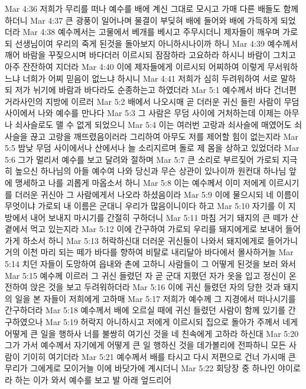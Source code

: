 Mar 4:36  저희가 무리를 떠나 예수를 배에 계신 그대로 모시고 가매 다른 배들도 함께 하더니
Mar 4:37  큰 광풍이 일어나며 물결이 부딪혀 배에 들어와 배에 가득하게 되었더라
Mar 4:38  예수께서는 고물에서 베개를 베시고 주무시더니 제자들이 깨우며 가로되 선생님이여 우리의 죽게 된것을 돌아보지 아니하시나이까 하니
Mar 4:39  예수께서 깨어 바람을 꾸짖으시며 바다더러 이르시되 잠잠하라 고요하라 하시니 바람이 그치고 아주 잔잔하여 지더라
Mar 4:40  이에 제자들에게 이르시되 어찌하여 이렇게 무서워하느냐 너희가 어찌 믿음이 없느냐 하시니
Mar 4:41  저희가 심히 두려워하여 서로 말하되 저가 뉘기에 바람과 바다라도 순종하는고 하였더라
Mar 5:1  예수께서 바다 건너편 거라사인의 지방에 이르러
Mar 5:2  배에서 나오시매 곧 더러운 귀신 들린 사람이 무덤 사이에서 나와 예수를 만나다
Mar 5:3  그 사람은 무덤 사이에 거처하는데 이제는 아무나 쇠사슬로도 맬 수 없게 되었으니
Mar 5:4  이는 여러번 고랑과 쇠사슬에 매였어도 쇠사슬을 끊고 고랑을 깨뜨렸음이러라 그리하여 아무도 저를 제어할 힘이 없는지라
Mar 5:5  밤낮 무덤 사이에서나 산에서나 늘 소리지르며 돌로 제 몸을 상하고 있었더라
Mar 5:6  그가 멀리서 예수를 보고 달려와 절하며
Mar 5:7  큰 소리로 부르짖어 가로되 지극히 높으신 하나님의 아들 예수여 나와 당신과 무슨 상관이 있나이까 원컨대 하나님 앞에 맹세하고 나를 괴롭게 마옵소서 하니
Mar 5:8  이는 예수께서 이미 저에게 이르시기를 더러운 귀신아 그 사람에게서 나오라 하셨음이라
Mar 5:9  이에 물으시되 네 이름이 무엇이냐 가로되 내 이름은 군대니 우리가 많음이니이다 하고
Mar 5:10  자기를 이 지방에서 내어 보내지 마시기를 간절히 구하더니
Mar 5:11  마침 거기 돼지의 큰 떼가 산 곁에서 먹고 있는지라
Mar 5:12  이에 간구하여 가로되 우리를 돼지에게로 보내어 들어가게 하소서 하니
Mar 5:13  허락하신대 더러운 귀신들이 나와서 돼지에게로 들어가니 거의 이천 마리 되는 떼가 바다를 향하여 비탈로 내리달아 바다에서 몰사하거늘
Mar 5:14  치던 자들이 도망하여 읍내와 촌에 고하니 사람들이 그 어떻게 된것을 보러 와서
Mar 5:15  예수께 이르러 그 귀신 들렸던 자 곧 군대 지폈던 자가 옷을 입고 정신이 온전하여 앉은 것을 보고 두려워하더라
Mar 5:16  이에 귀신 들렸던 자의 당한 것과 돼지의 일을 본 자들이 저희에게 고하매
Mar 5:17  저희가 예수께 그 지경에서 떠나시기를 간구하더라
Mar 5:18  예수께서 배에 오르실 때에 귀신 들렸던 사람이 함께 있기를 간구하였으나
Mar 5:19  허락지 아니하시고 저에게 이르시되 집으로 돌아가 주께서 네게 어떻게 큰 일을 행하사 너를 불쌍히 여기신 것을 네 친속에게 고하라 하신대
Mar 5:20  그가 가서 예수께서 자기에게 어떻게 큰 일 행하신 것을 데가볼리에 전파하니 모든 사람이 기이히 여기더라
Mar 5:21  예수께서 배를 타시고 다시 저편으로 건너 가시매 큰 무리가 그에게로 모이거늘 이에 바닷가에 계시더니
Mar 5:22  회당장 중 하나인 야이로라 하는 이가 와서 예수를 보고 발 아래 엎드리어
